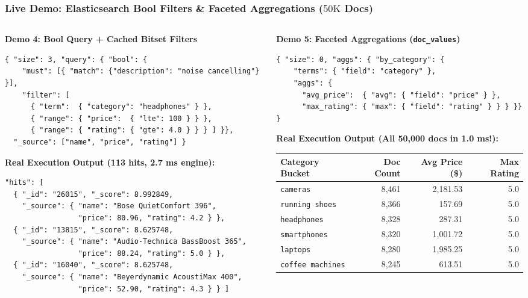 \documentclass[aspectratio=169]{beamer}
\begin{document}
\begin{frame}[fragile]
\frametitle{Live Demo: Elasticsearch Bool Filters \& Faceted Aggregations ($50\text{K}$ Docs)}
\begin{columns}[T]
\begin{column}{0.48\textwidth}
\textbf{\tiny Demo 4: Bool Query + Cached Bitset Filters}
\begin{lstlisting}
{ "size": 3, "query": { "bool": {
    "must": [{ "match": {"description": "noise cancelling"} }],
    "filter": [
      { "term":  { "category": "headphones" } },
      { "range": { "price":  { "lte": 100 } } },
      { "range": { "rating": { "gte": 4.0 } } } ] }},
  "_source": ["name", "price", "rating"] }
\end{lstlisting}
\textbf{\tiny Real Execution Output (113 hits, 2.7 ms engine):}
\begin{lstlisting}
"hits": [
  { "_id": "26015", "_score": 8.992849,
    "_source": { "name": "Bose QuietComfort 396",
                 "price": 80.96, "rating": 4.2 } },
  { "_id": "13815", "_score": 8.625748,
    "_source": { "name": "Audio-Technica BassBoost 365",
                 "price": 88.24, "rating": 5.0 } },
  { "_id": "16040", "_score": 8.625748,
    "_source": { "name": "Beyerdynamic AcoustiMax 400",
                 "price": 52.90, "rating": 4.3 } } ]
\end{lstlisting}
\end{column}
\begin{column}{0.49\textwidth}
\textbf{\tiny Demo 5: Faceted Aggregations (\texttt{doc\_values})}
\begin{lstlisting}
{ "size": 0, "aggs": { "by_category": {
    "terms": { "field": "category" },
    "aggs": {
      "avg_price":  { "avg": { "field": "price" } },
      "max_rating": { "max": { "field": "rating" } } } }} }
\end{lstlisting}
\textbf{\tiny Real Execution Output (All 50,000 docs in 1.0 ms!):}
\vspace{0.03cm}
\centering
\tiny
\begin{tabular}{lrrr}
\toprule
\textbf{Category Bucket} & \textbf{Doc Count} & \textbf{Avg Price (\$)} & \textbf{Max Rating} \\
\midrule
\texttt{cameras}         & 8,461 & 2,181.53 & 5.0 \\
\texttt{running shoes}   & 8,366 &   157.69 & 5.0 \\
\texttt{headphones}      & 8,328 &   287.31 & 5.0 \\
\texttt{smartphones}     & 8,320 & 1,001.72 & 5.0 \\
\texttt{laptops}         & 8,280 & 1,985.25 & 5.0 \\
\texttt{coffee machines} & 8,245 &   613.51 & 5.0 \\
\bottomrule
\end{tabular}
\end{column}
\end{columns}
\end{frame}
\end{document}
